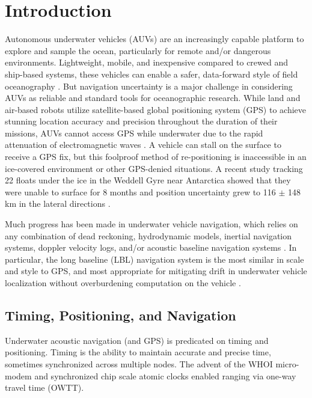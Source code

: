 \section{Introduction}
\label{sec:1}  

Autonomous underwater vehicles (AUVs) are an increasingly capable platform to explore and sample the ocean, particularly for remote and/or dangerous environments.
Lightweight, mobile, and inexpensive compared to crewed and ship-based systems, these vehicles can enable a safer, data-forward style of field oceanography \citep{bellingham_robotics_2007,petillot_underwater_2019}.
But navigation uncertainty is a major challenge in considering AUVs as reliable and standard tools for oceanographic research.
While land and air-based robots utilize satellite-based global positioning system (GPS) to achieve stunning location accuracy and precision throughout the duration of their missions, AUVs cannot access GPS while underwater due to the rapid attenuation of electromagnetic waves \citep{preisig_acoustic_2007}.
A vehicle can stall on the surface to receive a GPS fix, but this foolproof method of re-positioning is inaccessible in an ice-covered environment or other GPS-denied situations.
A recent study tracking 22 floats under the ice in the Weddell Gyre near Antarctica showed that they were unable to surface for 8 months and position uncertainty grew to 116 $\pm$ 148 km in the lateral directions \citep{chamberlain_observing_2018}.

Much progress has been made in underwater vehicle navigation, which relies on any combination of dead reckoning, hydrodynamic models, inertial navigation systems, doppler velocity logs, and/or acoustic baseline navigation systems \citep{paull_auv_2014}.
In particular, the long baseline (LBL) navigation system is the most similar in scale and style to GPS, and most appropriate for mitigating drift in underwater vehicle localization without overburdening computation on the vehicle \citep{van_uffelen_global_2021}.

\subsection{Timing, Positioning, and Navigation}

Underwater acoustic navigation (and GPS) is predicated on timing and positioning.
Timing is the ability to maintain accurate and precise time, sometimes synchronized across multiple nodes.
 The advent of the WHOI micro-modem \citep{singh_underwater_2006} and synchronized chip scale atomic clocks \citep{gardner_second_2016} enabled ranging via one-way travel time (OWTT).

